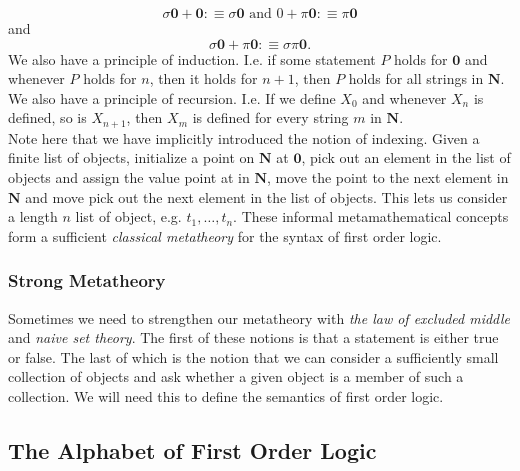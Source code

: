 $$\sigma\mathbf{0}+\mathbf{0} :\equiv \sigma\mathbf{0} \text{ and } 0 + \pi\mathbf{0} :\equiv \pi\mathbf{0}$$
and 
$$\sigma\mathbf{0} + \pi\mathbf{0} :\equiv \sigma\pi \mathbf{0}.$$
We also have a principle of induction. I.e. if some statement $P$ holds for $\mathbf{0}$ and whenever $P$ holds for $n$, then it holds for $n+1$, then $P$ holds for all strings in $\mathbf{N}$.\\ 
We also have a principle of recursion. I.e. If we define $X_0$ and whenever $X_n$ is defined, so is $X_{n+1}$, then $X_m$ is defined for every string $m$ in $\mathbf{N}$.\\
Note here that we have implicitly introduced the notion of indexing. Given a finite list of objects, initialize a point on $\mathbf{N}$ at $\mathbf{0}$, pick out an element in the list of objects and assign the value point at in $\mathbf{N}$, move the point to the next element in $\mathbf{N}$ and move pick out the next element in the list of objects. This lets us consider a length $n$ list of object, e.g. $t_1,\dots,t_n$. These informal metamathematical concepts form a sufficient \emph{classical metatheory} for the syntax of  first order logic. 
\subsubsection{Strong Metatheory}
Sometimes we need to strengthen our metatheory with \emph{the law of excluded middle} and \emph{naive set theory}. The first of these notions is that a statement is either true or false. The last of which is the notion that we can consider a sufficiently small collection of objects and ask whether a given object is a member of such a collection. We will need this to define the semantics of first order logic.
\subsection{The Alphabet of First Order Logic}

